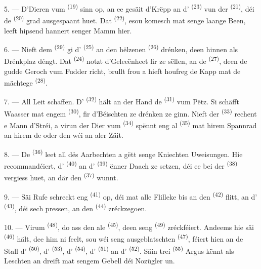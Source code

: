 5. --- D'Dieren vum  \textsuperscript{(19)} sinn op, an ee gesäit
d'Krëpp an d' \textsuperscript{(23)} vun der 
\textsuperscript{(21)}, déi de  \textsuperscript{(20)} grad
ausgespaant huet. Dat  \textsuperscript{(22)}, esou komesch mat senge
laange Been, leeft hipsend hannert senger Mamm hier.

6. --- Nieft dem  \textsuperscript{(29)} gi d'
\textsuperscript{(25)} an den hëlzenen  \textsuperscript{(26)} drénken,
deen hinnen als Drénkplaz déngt. Dat  \textsuperscript{(24)} notzt
d'Geleeënheet fir ze sëllen, an de  \textsuperscript{(27)}, deen de
gudde Geroch vum Fudder richt, brullt frou a hieft houfreg de Kapp mat de mächtege
 \textsuperscript{(28)}.

7. --- All Leit schaffen. D' \textsuperscript{(32)} hält an
der Hand de  \textsuperscript{(31)} vum Pëtz. Si schäfft Waasser mat
engem  \textsuperscript{(30)}, fir d'Béischten ze drénken ze ginn. Nieft
der  \textsuperscript{(33)} rechent e Mann d'Stréi, a virun der Dier
vum  \textsuperscript{(34)} spënnt eng al 
\textsuperscript{(35)} mat hirem Spannrad an hirem  de
 oder den  wéi an aler Zäit.

\VUsaut{3.0mm}
\VUsaut{3.0mm}

8. --- De  \textsuperscript{(36)} leet all dës Aarbechten a gëtt senge
Kniechten Uweisungen. Hie recommandéiert, d' \textsuperscript{(40)} an
d' \textsuperscript{(39)} ënner Daach ze setzen, déi ee bei der
 \textsuperscript{(38)} vergiess huet, an där den 
\textsuperscript{(37)} wunnt.

9. --- Säi Rufe schreckt eng  \textsuperscript{(41)} op, déi mat alle
Flilleke bis an den  \textsuperscript{(42)} flitt, an
d' \textsuperscript{(43)}, déi sech pressen, an den
 \textsuperscript{(44)} zréckzegoen.

10. --- Virum  \textsuperscript{(48)}, do ass den ale
 \textsuperscript{(45)}, deen seng 
\textsuperscript{(49)} zréckféiert. Andeems hie säi 
\textsuperscript{(46)} hält, dee him ni feelt, sou wéi seng ausgeblatschten
 \textsuperscript{(47)}, féiert hien an de Stall d'
\textsuperscript{(50)}, d' \textsuperscript{(53)}, d'
\textsuperscript{(54)}, d' \textsuperscript{(51)} an d'
\textsuperscript{(52)}. Säin trei  \textsuperscript{(55)} Argus kënnt als
Leschten an dreift mat sengem Gebell déi Nozügler un.

